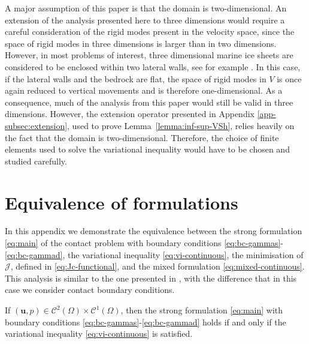\documentclass[onefignum,onetabnum]{siamart190516}
\newcommand{\bu}{\boldsymbol{u}}
\newcommand{\Cc}{\mathcal{C}}
\newcommand{\bCc}{\boldsymbol{\mathcal{C}}}
\newcommand{\Jc}{\mathcal{J}}
\begin{document}
A major assumption of this paper is that the domain is two-dimensional. An extension of the analysis presented here to three dimensions would require a careful consideration of the rigid modes present in the velocity space, since the space of rigid modes in three dimensions is larger than in two dimensions. However, in most problems of interest, three dimensional marine ice sheets are considered to be enclosed within two lateral walls, see for example \cite{favier2012}. In this case, if the lateral walls and the bedrock are flat, the space of rigid modes in $V$ is once again reduced to vertical movements and is therefore one-dimensional. As a consequence, much of the analysis from this paper would still be valid in three dimensions. However, the extension operator presented in Appendix \ref{app-subsec:extension}, used to prove Lemma~\ref{lemma:inf-sup-VSh}, relies heavily on the fact that the domain is two-dimensional. Therefore, the choice of finite elements used to solve the variational inequality would have to be chosen and studied carefully.


		
\appendix

\section{Equivalence of formulations}\label{app:equivalence-forms}

In this appendix we demonstrate the equivalence between the strong formulation \eqref{eq:main} of the contact problem with boundary conditions \eqref{eq:bc-gammas}-\eqref{eq:bc-gammad}, the variational inequality \eqref{eq:vi-continuous}, the minimisation of $\Jc$, defined in \eqref{eq:Jc-functional}, and the mixed formulation \eqref{eq:mixed-continuous}. This analysis is similar to the one presented in \cite{chen2013}, with the difference that in this case we consider contact boundary conditions.

\begin{lemma}
	If $(\bu,p)\in \bCc^2(\Omega)\times \Cc^1(\Omega)$, then the strong formulation \eqref{eq:main} with boundary conditions \eqref{eq:bc-gammas}-\eqref{eq:bc-gammad} holds if and only if the variational inequality \eqref{eq:vi-continuous} is satisfied.
\end{lemma}
\end{document}
